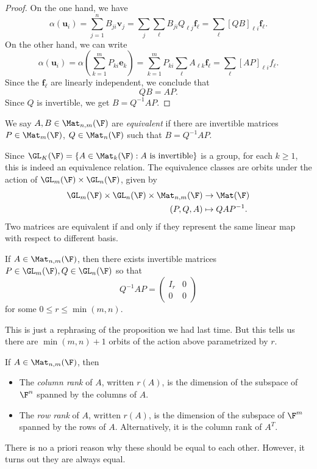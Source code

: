 \documentclass[a4paper]{article}
\begin{document}
\begin{proof}
  On the one hand, we have
  \[
    \alpha(\mathbf{u}_i) = \sum_{j = 1}^n B_{ji}\mathbf{v}_j = \sum_j\sum_\ell B_{ji} Q_{\ell j}\mathbf{f}_\ell = \sum_\ell [QB]_{\ell i}\mathbf{f}_\ell.
  \]
  On the other hand, we can write
  \[
    \alpha (\mathbf{u}_i) = \alpha \left(\sum_{k = 1}^m P_{ki}\mathbf{e}_k\right) = \sum_{k = 1}^m P_{ki} \sum_\ell A_{\ell k}\mathbf{f}_\ell = \sum_{\ell}[AP]_{\ell i} f_\ell.
  \]
  Since the $\mathbf{f}_\ell$ are linearly independent, we conclude that
  \[
    QB = AP.
  \]
  Since $Q$ is invertible, we get $B = Q^{-1}AP$.
\end{proof}

\begin{defi}
  We say $A, B\in \Mat_{n, m}(\F)$ are \emph{equivalent} if there are invertible matrices $P\in\Mat_{m}(\F)$, $Q\in \Mat_n (\F)$ such that $B = Q^{-1}AP$.
\end{defi}
Since $\GL_K(\F) = \{A \in \Mat_k(\F): A\text{ is invertible}\}$ is a group, for each $k \geq 1$, this is indeed an equivalence relation. The equivalence classes are orbits under the action of $\GL_m(\F) \times \GL_n(\F)$, given by
\begin{align*}
  \GL_m(\F) \times \GL_n(\F)\times \Mat_{n, m}(\F) &\to \Mat (\F)\\
  (P, Q, A) &\mapsto QAP^{-1}.
\end{align*}
Two matrices are equivalent if and only if they represent the same linear map with respect to different basis.

\begin{cor}
  If $A\in \Mat_{n, m}(\F)$, then there exists invertible matrices $P \in \GL_m(\F), Q\in \GL_n(\F)$ so that
  \[
    Q^{-1}AP =
    \begin{pmatrix}
      I_r & 0\\
      0 & 0
    \end{pmatrix}
  \]
  for some $0 \leq r \leq \min(m, n)$.
\end{cor}
This is just a rephrasing of the proposition we had last time. But this tells us there are $\min(m, n) + 1$ orbits of the action above parametrized by $r$.

\begin{defi}
  If $A\in \Mat_{n, m}(\F)$,  then
  \begin{itemize}
    \item The \emph{column rank} of $A$, written $r(A)$, is the dimension of the subspace of $\F^n$ spanned by the columns of $A$.
    \item The \emph{row rank} of $A$, written $r(A)$, is the dimension of the subspace of $\F^m$ spanned by the rows of $A$. Alternatively, it is the column rank of $A^T$.
  \end{itemize}
\end{defi}
There is no a priori reason why these should be equal to each other. However, it turns out they are always equal.
\end{document}
